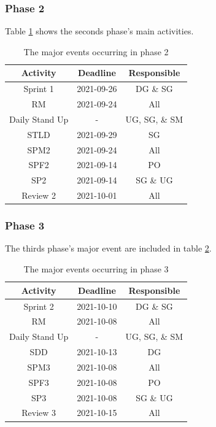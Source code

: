 \documentclass{article}
\begin{document}
\subsubsection{Phase 2}
Table \ref{tab:phase2} shows the seconds phase's main activities.
\begin{table}[H]
    \centering
    \begin{tabular}{|c|c|c|}
    \hline
        Activity & Deadline & Responsible \\
        \hline \hline
        Sprint 1 & 2021-09-26 & DG \& SG \\
        \hline
        RM & 2021-09-24 & All \\
        \hline
        Daily Stand Up & - & UG, SG, \& SM \\
        \hline
        STLD & 2021-09-29 & SG \\
        \hline
        SPM2 & 2021-09-24 & All \\
        \hline
        SPF2 & 2021-09-14 & PO \\
        \hline
        SP2 & 2021-09-14 & SG \& UG \\
        \hline
        Review 2 & 2021-10-01 & All \\
        \hline
    \end{tabular}
    \caption{The major events occurring in phase 2}
    \label{tab:phase2}
\end{table}

\subsubsection{Phase 3}
The thirds phase's major event are included in table \ref{tab:phase3}.
\begin{table}[H]
    \centering
    \begin{tabular}{|c|c|c|}
    \hline
        Activity & Deadline & Responsible \\
        \hline \hline
        Sprint 2 & 2021-10-10 & DG \& SG \\
        \hline
        RM & 2021-10-08 & All \\
        \hline
        Daily Stand Up & - & UG, SG, \& SM \\
        \hline
        SDD & 2021-10-13 & DG \\
        \hline
        SPM3 & 2021-10-08 & All \\
        \hline
        SPF3 & 2021-10-08 & PO \\
        \hline
        SP3 & 2021-10-08 & SG \& UG \\
        \hline
        Review 3 & 2021-10-15 & All \\
        \hline
    \end{tabular}
    \caption{The major events occurring in phase 3}
    \label{tab:phase3}
\end{table}
\end{document}
